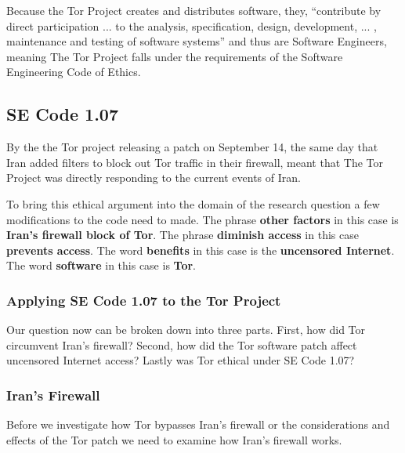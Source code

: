\documentclass[11pt]{article}
\begin{document}
\begin{multicols}{2}
Because the Tor Project creates and distributes software, they, ``contribute by
direct participation ...  to the analysis, specification, design, development,
... , maintenance and testing of software systems'' and thus are Software
Engineers, meaning The Tor Project falls under the requirements of the Software
Engineering Code of Ethics.\cite{Tor:FAQ, Tor:Overview} 




\subsection{SE Code 1.07} 

\newline

By the the Tor project releasing a patch on September 14, the same day that Iran
added filters to block out Tor traffic in their firewall, meant that The Tor
Project was directly responding to the current events of Iran.

To bring this ethical argument into the domain of the research question a few
modifications to the code need to made. The phrase \textbf{other factors} in
this case is \textbf{Iran's firewall block of Tor}. The phrase \textbf{diminish
access} in this case \textbf{prevents access}. The word \textbf{benefits} in
this case is the \textbf{uncensored Internet}. The word \textbf{software} in
this case is \textbf{Tor}.

\subsubsection{Applying SE Code 1.07 to the Tor Project}

\newline

Our question now can be broken down into three parts. First, how did Tor
circumvent Iran's firewall? Second, how did the Tor software patch affect
uncensored Internet access?  Lastly was Tor ethical under SE Code 1.07?

\subsubsection{Iran's Firewall}
Before we investigate how Tor bypasses Iran's firewall or the considerations and
effects of the Tor patch we need to examine how Iran's firewall works.


\end{multicols}
\end{document}
